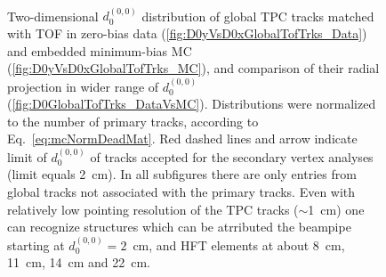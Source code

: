 \begin{figure}[b!]
\parbox{0.4725\textwidth}{
  \centering
  \begin{subfigure}[b]{\linewidth}\addtocounter{subfigure}{-2}
  \end{subfigure}\\
  \begin{minipage}[t][1.042\linewidth][t]{\linewidth}\vspace{10pt}
    \caption[Comparison of $d_{0}^{(0,0)}$ distribution of global TPC tracks matched with TOF in zero-bias data and embedded MC (minimum-bias).]{Two-dimensional $d_{0}^{(0,0)}$ distribution of global TPC tracks matched with TOF in zero-bias data (\ref{fig:D0yVsD0xGlobalTofTrks_Data}) and embedded minimum-bias MC (\ref{fig:D0yVsD0xGlobalTofTrks_MC}), and comparison of their radial projection in wider range of $d_{0}^{(0,0)}$ (\ref{fig:D0GlobalTofTrks_DataVsMC}). Distributions were normalized to the number of primary tracks, according to Eq.~\eqref{eq:mcNormDeadMat}. Red dashed lines and arrow indicate limit of $d_{0}^{(0,0)}$ of tracks accepted for the secondary vertex analyses (limit equals 2~cm). In all subfigures there are only entries from global tracks not associated with the primary tracks. Even with relatively low pointing resolution of the TPC tracks ($\sim$1~cm) one can recognize structures which can be atrributed the beampipe starting at $d_{0}^{(0,0)}=2$~cm, and HFT elements at about 8~cm, 11~cm, 14~cm and 22~cm.}\label{fig:deadMatDataVsMC2}
  \end{minipage}
}\vspace{-30pt}%
\end{figure}

